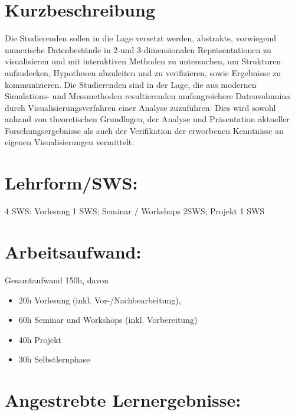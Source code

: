 \section*{Kurzbeschreibung}\label{kurzbeschreibung-9}

Die Studierenden sollen in die Lage versetzt werden, abstrakte,
vorwiegend numerische Datenbestände in 2-und 3-dimensionalen
Repräsentationen zu visualisieren und mit interaktiven Methoden zu
untersuchen, um Strukturen aufzudecken, Hypothesen abzuleiten und zu
verifizieren, sowie Ergebnisse zu kommunizieren. Die Studierenden sind
in der Lage, die aus modernen Simulations- und Messmethoden
resultierenden umfangreichere Datenvolumina durch
Visualisierungsverfahren einer Analyse zuzuführen. Dies wird sowohl
anhand von theoretischen Grundlagen, der Analyse und Präsentation
aktueller Forschungsergebnisse als auch der Verifikation der erworbenen
Kenntnisse an eigenen Visualisierungen vermittelt.

\section*{Lehrform/SWS:}\label{lehrformsws-18}

4 SWS: Vorlesung 1 SWS; Seminar / Workshops 2SWS; Projekt 1 SWS

\section*{Arbeitsaufwand:}\label{arbeitsaufwand-24}

Gesamtaufwand 150h, davon

\begin{itemize}
\item
  20h Vorlesung (inkl. Vor-/Nachbearbeitung),
\item
  60h Seminar und Workshops (inkl. Vorbereitung)
\item
  40h Projekt
\item
  30h Selbstlernphase
\end{itemize}

\section*{Angestrebte
Lernergebnisse:}\label{angestrebte-lernergebnisse-18}


